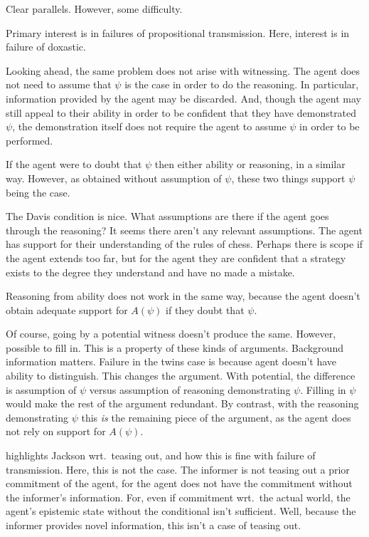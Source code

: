 \documentclass[10pt]{article}
\begin{document}
\begin{note}
  Clear parallels.
  However, some difficulty.

  Primary interest is in failures of propositional transmission.
  Here, interest is in failure of doxastic.
\end{note}

\begin{note}
  Looking ahead, the same problem does not arise with witnessing.
  The agent does not need to assume that \(\psi\) is the case in order to do the reasoning.
  In particular, information provided by the agent may be discarded.
  And, though the agent may still appeal to their ability in order to be confident that they have demonstrated \(\psi\), the demonstration itself does not require the agent to assume \(\psi\) in order to be performed.

  If the agent were to doubt that \(\psi\) then either ability or reasoning, in a similar way.
  However, as obtained without assumption of \(\psi\), these two things support \(\psi\) being the case.

  The Davis condition is nice.
  What assumptions are there if the agent goes through the reasoning?
  It seems there aren't any relevant assumptions.
  The agent has support for their understanding of the rules of chess.
  Perhaps there is scope if the agent extends too far, but for the agent they are confident that a strategy exists to the degree they understand and have no made a mistake.

  Reasoning from ability does not work in the same way, because the agent doesn't obtain adequate support for \(A(\psi)\) if they doubt that \(\psi\).

  Of course, going by a potential witness doesn't produce the same.
  However, possible to fill in.
  This is a property of these kinds of arguments.
  Background information matters.
  Failure in the twins case is because agent doesn't have ability to distinguish.
  This changes the argument.
  With potential, the difference is assumption of \(\psi\) versus assumption of reasoning demonstrating \(\psi\).
  Filling in \(\psi\) would make the rest of the argument redundant.
  By contrast, with the reasoning demonstrating \(\psi\) this \emph{is} the remaining piece of the argument, as the agent does not rely on support for \(A(\psi)\).
\end{note}

\begin{note}
  \cite{Otero:2018we} highlights Jackson wrt.\ teasing out, and how this is fine with failure of transmission.
  Here, this is not the case.
  The informer is not teasing out a prior commitment of the agent, for the agent does not have the commitment without the informer's information.
  For, even if commitment wrt.\ the actual world, the agent's epistemic state without the conditional isn't sufficient.
  Well, because the informer provides novel information, this isn't a case of teasing out.
\end{note}
\end{document}
